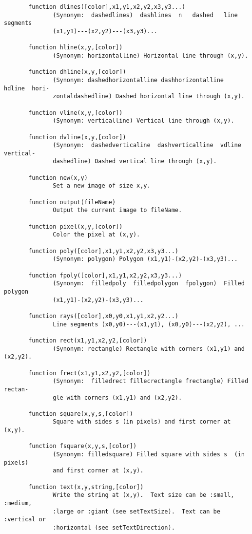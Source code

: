 \begin{codesize}
\begin{verbatim}
       function dlines([color],x1,y1,x2,y2,x3,y3...)
              (Synonym:  dashedlines)  dashlines  n   dashed   line   segments
              (x1,y1)---(x2,y2)---(x3,y3)...

       function hline(x,y,[color])
              (Synonym: horizontalline) Horizontal line through (x,y).

       function dhline(x,y,[color])
              (Synonym: dashedhorizontalline dashhorizontalline  hdline  hori‐
              zontaldashedline) Dashed horizontal line through (x,y).

       function vline(x,y,[color])
              (Synonym: verticalline) Vertical line through (x,y).

       function dvline(x,y,[color])
              (Synonym:  dashedverticaline  dashverticalline  vdline vertical‐
              dashedline) Dashed vertical line through (x,y).

       function new(x,y)
              Set a new image of size x,y.

       function output(fileName)
              Output the current image to fileName.

       function pixel(x,y,[color])
              Color the pixel at (x,y).

       function poly([color],x1,y1,x2,y2,x3,y3...)
              (Synonym: polygon) Polygon (x1,y1)-(x2,y2)-(x3,y3)...

       function fpoly([color],x1,y1,x2,y2,x3,y3...)
              (Synonym:  filledpoly  filledpolygon  fpolygon)  Filled  polygon
              (x1,y1)-(x2,y2)-(x3,y3)...

       function rays([color],x0,y0,x1,y1,x2,y2...)
              Line segments (x0,y0)---(x1,y1), (x0,y0)---(x2,y2), ...

       function rect(x1,y1,x2,y2,[color])
              (Synonym: rectangle) Rectangle with corners (x1,y1) and (x2,y2).

       function frect(x1,y1,x2,y2,[color])
              (Synonym:  filledrect fillecrectangle frectangle) Filled rectan‐
              gle with corners (x1,y1) and (x2,y2).

       function square(x,y,s,[color])
              Square with sides s (in pixels) and first corner at (x,y).

       function fsquare(x,y,s,[color])
              (Synonym: filledsquare) Filled square with sides s  (in  pixels)
              and first corner at (x,y).

       function text(x,y,string,[color])
              Write the string at (x,y).  Text size can be :small, :medium,
              :large or :giant (see setTextSize).  Text can be :vertical or
              :horizontal (see setTextDirection).


\end{verbatim}
\end{codesize}
